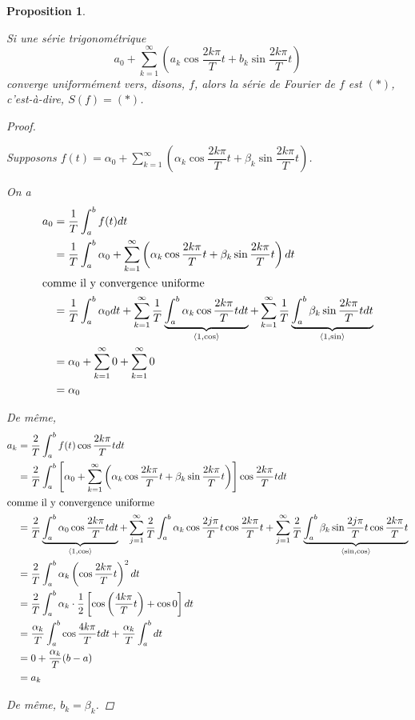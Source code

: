 \documentclass{report}
\newcommand*{\dsum}[4]{\displaystyle\sum_{#1=#2}^{#3}#4}
\newcommand*{\dint}[3]{\displaystyle\int_{#1}^{#2}#3}
\newtheorem*{prop}{Proposition}
\theoremstyle{definition}
\theoremstyle{remark}
\begin{document}
	\begin{prop}~

		Si une s\'erie trigonom\'etrique
		\begin{equation*}
			a_0 + \dsum{k}{1}{\infty}{\left( a_k \cos\dfrac{2k\pi}{T}t + b_k \sin\dfrac{2k\pi}{T}t \right)}\tag{$*$}
		\end{equation*}
		converge uniform\'ement vers, disons, $f$, alors la s\'erie de Fourier de $f$ est $(*)$, c'est-\`a-dire, $S(f) = (*)$.
		\begin{proof}~

			Supposons $f(t) = \alpha_0 + \dsum{k}{1}{\infty}{\left(\alpha_k\cos\dfrac{2k\pi}{T}t + \beta_k\sin\dfrac{2k\pi}{T}t\right)}$.

			On a
			\begin{align*}
				a_0&= \dfrac{1}{T} \dint{a}{b}{f(t) dt}\\
				&= \dfrac{1}{T} \dint{a}{b}{\alpha_0 + \dsum{k}{1}{\infty}{\left(\alpha_k\cos\dfrac{2k\pi}{T}t + \beta_k\sin\dfrac{2k\pi}{T}t\right)} dt}\\
				\shortintertext{comme il y convergence uniforme}
				&= \dfrac{1}{T} \dint{a}{b}{\alpha_0 dt} + \dsum{k}{1}{\infty}{\dfrac{1}{T} \underbrace{\dint{a}{b}{\alpha_k\cos\dfrac{2k\pi}{T}t dt}}_{\langle 1,\cos \rangle}} + \dsum{k}{1}{\infty}{\dfrac{1}{T} \underbrace{\dint{a}{b}{\beta_k\sin\dfrac{2k\pi}{T}t dt}}_{\langle 1,\sin \rangle}}\\
				&= \alpha_0 + \dsum{k}{1}{\infty}{0} + \dsum{k}{1}{\infty}{0}\\
				&= \alpha_0
			\end{align*}

			De m\^eme,
			\begin{align*}
				a_k&= \dfrac{2}{T} \dint{a}{b}{f(t)\cos\dfrac{2k\pi}{T}t dt}\\
				&= \dfrac{2}{T} \dint{a}{b}{\left[ \alpha_0 + \dsum{k}{1}{\infty}{\left(\alpha_k \cos\dfrac{2k\pi}{T}t + \beta_k\sin\dfrac{2k\pi}{T}t\right)} \right] \cos\dfrac{2k\pi}{T}t dt}\\
				\shortintertext{comme il y convergence uniforme}
				&= \dfrac{2}{T} \underbrace{\dint{a}{b}{\alpha_0 \cos\dfrac{2k\pi}{T}t dt}}_{\langle 1,\cos \rangle} + \dsum{j}{1}{\infty}{\dfrac{2}{T} \dint{a}{b}{\alpha_k \cos\dfrac{2j\pi}{T}t \cos\dfrac{2k\pi}{T}t}} + \dsum{j}{1}{\infty}{\dfrac{2}{T} \underbrace{\dint{a}{b}{\beta_k \sin\dfrac{2j\pi}{T}t \cos\dfrac{2k\pi}{T}t}}_{\langle \sin,\cos \rangle}}\\
				&= \dfrac{2}{T} \dint{a}{b}{\alpha_k \left(\cos\dfrac{2k\pi}{T}t\right)^2 dt}\\
				&= \dfrac{2}{T} \dint{a}{b}{\alpha_k \cdot \dfrac{1}{2} \left[\cos\left(\dfrac{4k\pi}{T}t\right) + \cos0\right] dt}\\
				&= \dfrac{\alpha_k}{T} \dint{a}{b}{\cos\dfrac{4k\pi}{T}t dt} + \dfrac{\alpha_k}{T} \dint{a}{b}{dt}\\
				&= 0 + \dfrac{\alpha_k}{T} (b-a)\\
				&= a_k
			\end{align*}

			De m\^eme, $b_k = \beta_k$.
		\end{proof}
	\end{prop}
\end{document}
